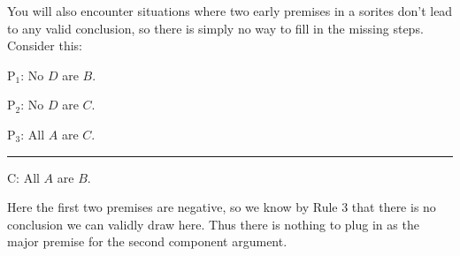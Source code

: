 You will also encounter situations where two early premises in a sorites don't lead to any valid conclusion, so there is simply no way to fill in the missing steps. Consider this:

\begin{earg}
\item[P$_1$:] No $D$ are $B$.
\item[P$_2$:] No $D$ are $C$.
\item[P$_3$:] All $A$ are $C$.
\vspace{-.5em}
\item [] \rule{0.2\linewidth}{.5pt} 
\item[C:] All $A$ are $B$.
\end{earg} 

Here the first two premises are negative, so we know by Rule 3 that there is no conclusion we can validly draw here. Thus there is nothing to plug in as the major premise for the second component argument. 

\begin{center}
\end{center}

